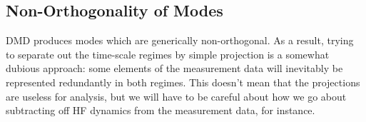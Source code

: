 \documentclass[11pt]{article} %
\begin{document}
\subsection{Non-Orthogonality of Modes}
DMD produces modes which are generically non-orthogonal. As a result, trying to separate out the time-scale regimes by simple projection is a somewhat dubious approach: some elements of the measurement data will inevitably be represented redundantly in both regimes. This doesn't mean that the projections are useless for analysis, but we will have to be careful about how we go about subtracting off HF dynamics from the measurement data, for instance. 
\end{document}
